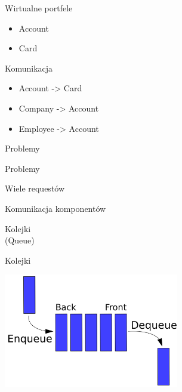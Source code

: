 \documentclass{beamer}
\begin{document}
\begin{frame}{Wirtualne portfele}
	\begin{huge}
		\begin{itemize}[<+->]
			\item Account
			\item Card
		\end{itemize}
	\end{huge}
\end{frame}

\begin{frame}{Komunikacja}
	\begin{huge}
		\begin{itemize}[<+->]
			\item Account -> Card
			\item Company -> Account
			\item Employee -> Account
		\end{itemize}
	\end{huge}
\end{frame}

\begin{frame}{}
	\begin{center}
		\Huge{Problemy}
	\end{center}
\end{frame}

\begin{frame}{Problemy}
	\begin{center}
		\Huge{Wiele requestów}
	\end{center}
\end{frame}

\begin{frame}{Komunikacja komponentów}
	\begin{center}
		\Huge{Kolejki}\\
		\huge{(Queue)}
	\end{center}
\end{frame}

\begin{frame}{Kolejki}
	\begin{center}
		\includegraphics[height=5cm]{queue1.png}
	\end{center}
\end{frame}
\end{document}
